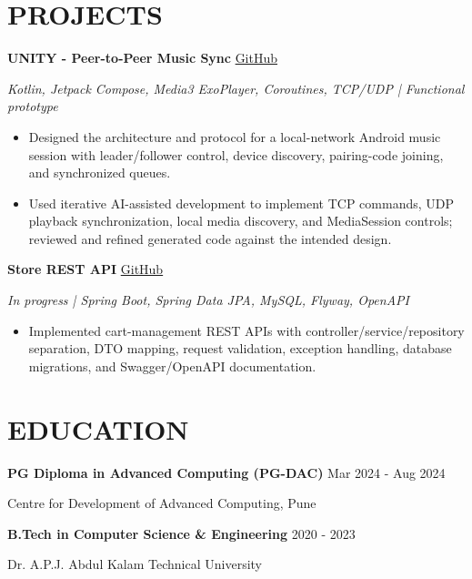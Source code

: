 \documentclass[a4paper,10pt]{article}
\begin{document}
\section{PROJECTS}
\textbf{UNITY - Peer-to-Peer Music Sync} \hfill \href{https://github.com/yugalteotia/unity-music-sync}{GitHub}\par
\textit{Kotlin, Jetpack Compose, Media3 ExoPlayer, Coroutines, TCP/UDP | Functional prototype}
\begin{itemize}
\item Designed the architecture and protocol for a local-network Android music session with leader/follower control, device discovery, pairing-code joining, and synchronized queues.
\item Used iterative AI-assisted development to implement TCP commands, UDP playback synchronization, local media discovery, and MediaSession controls; reviewed and refined generated code against the intended design.
\end{itemize}
\vspace{2pt}
\textbf{Store REST API} \hfill \href{https://github.com/yugalteotia/spring_api_starter}{GitHub}\par
\textit{In progress | Spring Boot, Spring Data JPA, MySQL, Flyway, OpenAPI}
\begin{itemize}
\item Implemented cart-management REST APIs with controller/service/repository separation, DTO mapping, request validation, exception handling, database migrations, and Swagger/OpenAPI documentation.
\end{itemize}

\section{EDUCATION}
\textbf{PG Diploma in Advanced Computing (PG-DAC)} \hfill Mar 2024 - Aug 2024\par
Centre for Development of Advanced Computing, Pune\par
\vspace{4pt}
\textbf{B.Tech in Computer Science \& Engineering} \hfill 2020 - 2023\par
Dr. A.P.J. Abdul Kalam Technical University
\end{document}

